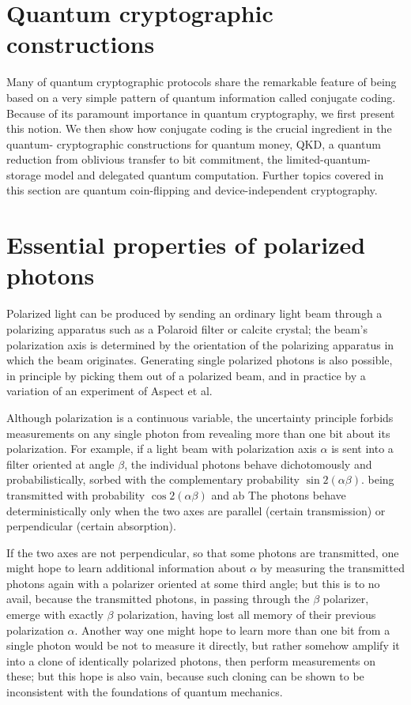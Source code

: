 \section{Quantum cryptographic constructions}
Many of quantum cryptographic protocols share the remarkable feature of being based on a very simple pattern of quantum information called conjugate coding. Because of its paramount importance in quantum cryptography, we first present this notion. We then show how conjugate coding is the crucial ingredient in the quantum- cryptographic constructions for quantum money, QKD, a quantum reduction from oblivious transfer to bit commitment, the limited-quantum-storage model and delegated quantum computation. Further topics covered in this section are quantum coin-flipping and device-independent cryptography.



\section{Essential properties of polarized photons}

Polarized light can be produced by sending an ordinary
light beam through a polarizing apparatus such as a Polaroid filter or calcite crystal; the beam’s polarization axis is determined by the orientation of the polarizing apparatus in which the beam originates. Generating single polarized photons is also possible, in principle by picking them out of a polarized beam, and in practice by a variation of an experiment of Aspect \textcite{Aspect1982} et al.

Although polarization is a continuous variable, the uncertainty principle forbids measurements on any single photon from revealing more than one bit about its polarization. For example, if a light beam with polarization axis $\alpha$ is sent into a filter oriented at angle $\beta$, the individual photons behave dichotomously and probabilistically, sorbed with the complementary probability $\sin{2(\alpha \beta)}$. being transmitted with probability $\cos{2(\alpha \beta)}$ and ab The photons behave deterministically only when the two axes are parallel (certain transmission) or perpendicular (certain absorption). 

If the two axes are not perpendicular, so that some photons are transmitted, one might hope to learn additional information about $\alpha$ by measuring the transmitted photons again with a polarizer oriented at some third angle; but this is to no avail, because the transmitted photons, in passing through the $\beta$ polarizer, emerge with exactly $\beta$ polarization, having lost all memory of their previous polarization $\alpha$. Another way one might hope to learn more than one bit from a single photon would be not to measure it directly, but rather somehow amplify it into a clone of identically polarized photons, then perform measurements on these; but this hope is also vain, because such cloning can be shown to be inconsistent with the foundations of quantum mechanics\textcite{Wootters1982}.
